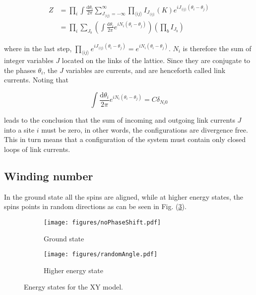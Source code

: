 \begin{align}
    Z &= \prod_i \int \frac{\mathrm d \theta_i}{2 \pi} \sum_{J_{\langle ij \rangle} = -\infty}^{\infty} \prod_{\langle ij \rangle} I_{J_{\langle ij \rangle}} ( K ) e^{i J_{\langle ij \rangle} (\theta_i - \theta_j)} \\
\label{eq:xypart2}
% 
    &=  \prod_i \sum_{J_b} \left ( \int \frac{\mathrm d \theta_i}{2 \pi} e^{i N_i (\theta_i - \theta_j)} \right ) \left ( \prod_b I_{J_b} \right ) 
\end{align}

\noindent where in the last step, $\prod_{\langle ij \rangle} e^{iJ_{\langle ij \rangle} (\theta_i - \theta_j)} = e^{iN_i (\theta_i - \theta_j)}$. $N_i$ is therefore the sum of integer variables $J$ located on the links of the lattice. Since they are conjugate to the phases $\theta_i$, the $J$ variables are currents, and are henceforth called link currents. Noting that

\begin{equation}
    \int \frac{\mathrm d \theta_i}{2 \pi} e^{i N_i (\theta_i - \theta_j)} = C \delta_{N_i 0}
\end{equation}

\noindent leads to the conclusion that the sum of incoming and outgoing link currents $J$ into a site $i$ must be zero, in other words, the configurations are divergence free. This in turn means that a configuration of the system must contain only closed loops of link currents.


\subsection{Winding number}
\label{subsec:XYWindingNum}

In the ground state all the spins are aligned, while at higher energy states, the spins points in random directions as can be seen in Fig. (\ref{fig:xygroundhigher}).

\begin{figure}[h!]
\centering
    \begin{subfigure}{.4\textwidth}
        \centering
        \texttt{[image: figures/noPhaseShift.pdf]}
        \caption{Ground state}
        \label{fig:xyground}
    \end{subfigure}
    \begin{subfigure}{.4\textwidth}
        \centering
        \texttt{[image: figures/randomAngle.pdf]}
        \caption{Higher energy state}
        \label{fig:xyhigher}
    \end{subfigure}
    \caption{Energy states for the XY model.}
\label{fig:xygroundhigher}
\end{figure}

